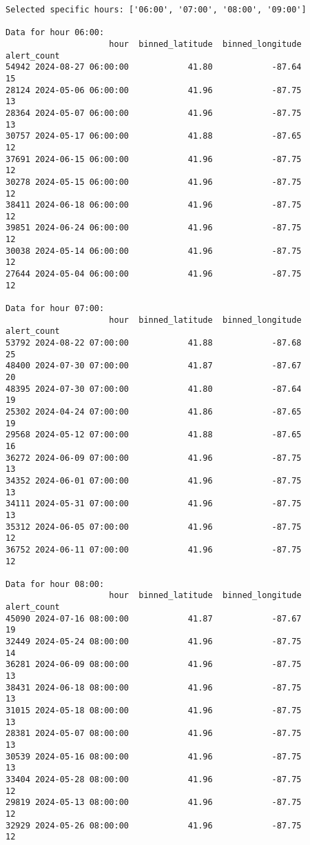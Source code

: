 \documentclass[
  letterpaper,
  DIV=11,
  numbers=noendperiod]{scrartcl}
\begin{document}
\begin{verbatim}
Selected specific hours: ['06:00', '07:00', '08:00', '09:00']

Data for hour 06:00:
                     hour  binned_latitude  binned_longitude  alert_count
54942 2024-08-27 06:00:00            41.80            -87.64           15
28124 2024-05-06 06:00:00            41.96            -87.75           13
28364 2024-05-07 06:00:00            41.96            -87.75           13
30757 2024-05-17 06:00:00            41.88            -87.65           12
37691 2024-06-15 06:00:00            41.96            -87.75           12
30278 2024-05-15 06:00:00            41.96            -87.75           12
38411 2024-06-18 06:00:00            41.96            -87.75           12
39851 2024-06-24 06:00:00            41.96            -87.75           12
30038 2024-05-14 06:00:00            41.96            -87.75           12
27644 2024-05-04 06:00:00            41.96            -87.75           12

Data for hour 07:00:
                     hour  binned_latitude  binned_longitude  alert_count
53792 2024-08-22 07:00:00            41.88            -87.68           25
48400 2024-07-30 07:00:00            41.87            -87.67           20
48395 2024-07-30 07:00:00            41.80            -87.64           19
25302 2024-04-24 07:00:00            41.86            -87.65           19
29568 2024-05-12 07:00:00            41.88            -87.65           16
36272 2024-06-09 07:00:00            41.96            -87.75           13
34352 2024-06-01 07:00:00            41.96            -87.75           13
34111 2024-05-31 07:00:00            41.96            -87.75           13
35312 2024-06-05 07:00:00            41.96            -87.75           12
36752 2024-06-11 07:00:00            41.96            -87.75           12

Data for hour 08:00:
                     hour  binned_latitude  binned_longitude  alert_count
45090 2024-07-16 08:00:00            41.87            -87.67           19
32449 2024-05-24 08:00:00            41.96            -87.75           14
36281 2024-06-09 08:00:00            41.96            -87.75           13
38431 2024-06-18 08:00:00            41.96            -87.75           13
31015 2024-05-18 08:00:00            41.96            -87.75           13
28381 2024-05-07 08:00:00            41.96            -87.75           13
30539 2024-05-16 08:00:00            41.96            -87.75           13
33404 2024-05-28 08:00:00            41.96            -87.75           12
29819 2024-05-13 08:00:00            41.96            -87.75           12
32929 2024-05-26 08:00:00            41.96            -87.75           12


\end{verbatim}
\end{document}

